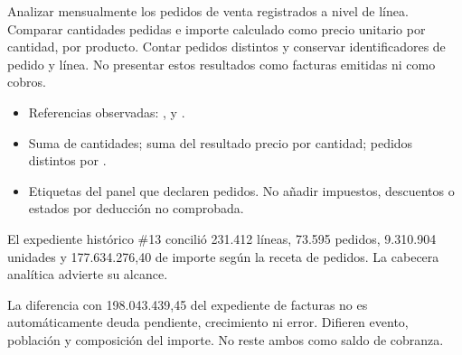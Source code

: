 \label{wwi05}
\begin{goal}
Analizar mensualmente los pedidos de venta registrados a nivel de línea. Comparar cantidades pedidas e importe calculado como precio unitario por cantidad, por producto. Contar pedidos distintos y conservar identificadores de pedido y línea. No presentar estos resultados como facturas emitidas ni como cobros.
\end{goal}
\begin{itemize}
\item Referencias observadas: ,  y .
\item Suma de cantidades; suma del resultado precio por cantidad; pedidos distintos por .
\item Etiquetas del panel que declaren pedidos. No añadir impuestos, descuentos o estados por deducción no comprobada.
\end{itemize}
\begin{good}
El expediente histórico \#13 concilió 231.412 líneas, 73.595 pedidos, 9.310.904 unidades y 177.634.276,40 de importe según la receta de pedidos. La cabecera analítica advierte su alcance.
\end{good}
\begin{note}
La diferencia con 198.043.439,45 del expediente de facturas no es automáticamente deuda pendiente, crecimiento ni error. Difieren evento, población y composición del importe. No reste ambos como saldo de cobranza.
\end{note}

